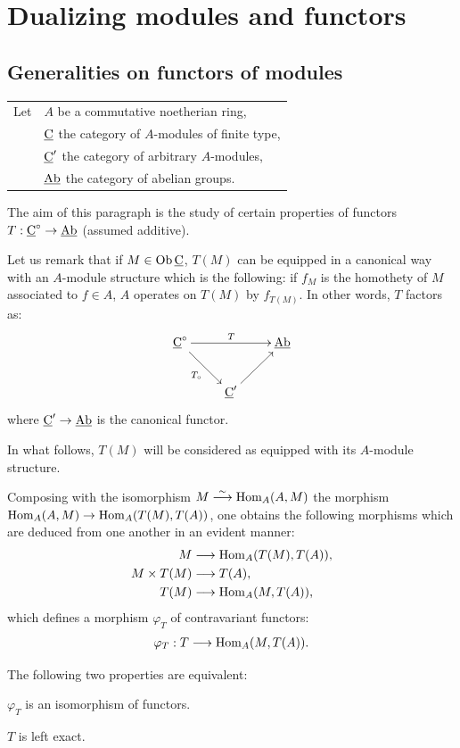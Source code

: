 \chapter{Dualizing modules and functors} \label{IV}

\section{Generalities on functors of modules} \label{IV.1}
\begin{tabular}{ll}
Let &$A$ be a commutative noetherian ring,\\
&$\underline{\mathrm{C}}$ the category of $A$-modules of finite type,\\
&$\underline{\mathrm{C}}'$ the category of arbitrary $A$-modules,\\
&$\underline{\mathrm{Ab}}$ the category of abelian groups.\label{pIV.1}
\end{tabular}

\smallskip
The aim of this paragraph is the study of certain properties of functors \hbox{$T: \ccat^{\circ}\to \Ab$} (assumed additive).

Let us remark that if $M\in \operatorname{Ob} \underline{\mathrm{C}}$, $T(M)$ can be equipped in a canonical way with an $A$-module structure which is the following:
if $f_{M}$ is the homothety of $M$ associated to $f\in A$, $A$
operates on $T(M)$ by $f_{T(M)}$. In other words, $T$
factors as:
$$
\xymatrix{ \ccat^{\circ}\ar^{T}[rr]\ar_{T_{\circ}}[dr]&&\Ab\\
&\ccat'\ar[ur]&}
$$
where $\ccat'\to \Ab$ is the canonical functor.

In what follows, $T(M)$ will be considered as equipped with its $A$-module structure.

Composing with the isomorphism \hbox{$M\overset{\sim}{\longrightarrow} \operatorname{Hom}_{A}(A, M)$} the morphism $\Hom_{A}(A, M)\to \Hom_{A}(T(M), T(A))$, one obtains the following morphisms which are deduced from one another in an evident manner:
\begin{align*}
M&\to \Hom_{A}(T(M), T(A)),\\
M\times T(M)&\to T(A),\\
T(M)&\to \Hom_{A}(M, T(A)),
\end{align*}
which defines a morphism $\varphi_{T}$ of contravariant functors:
\begin{eqnarray*}
\varphi_{T}: T\to \Hom_{A}(M, T(A)).
\end{eqnarray*}

\begin{proposition} \label{IV.1.1}
The following two properties are equivalent:
\begin{enumeratei}
\item
$\varphi_{T}$ is an isomorphism of functors.

\item
$T$ is left exact.
\end{enumeratei}
\end{proposition}

